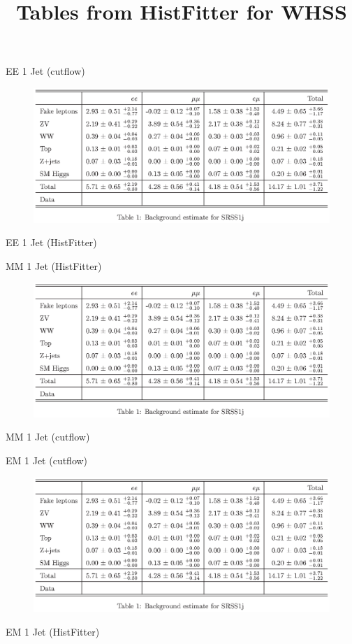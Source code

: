 \documentclass[14pt,a4paper]{atlasnote}
\title{Tables from HistFitter for WHSS}
\begin{document}
\newpage
\vfill
\center
EE 1 Jet (cutflow)
\begin{figure}[H]
\includegraphics{figures/WHSS1j.eps}
\end{figure}
EE 1 Jet (HistFitter)

\vfill
\clearpage

\newpage
\vfill
\center
MM 1 Jet (HistFitter)
\begin{figure}[H]
\includegraphics{figures/WHSS1j.eps}
\end{figure}
MM 1 Jet (cutflow)

\vfill
\clearpage

\newpage
\vfill
\center
EM 1 Jet (cutflow)
\begin{figure}[H]
\includegraphics{figures/WHSS1j.eps}
\end{figure}
EM 1 Jet (HistFitter)

\vfill
\clearpage
\end{document}
